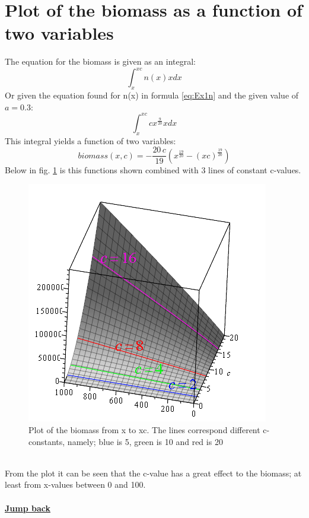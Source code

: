 \documentclass{article}
\numberwithin{equation}{section} %
\begin{document}
\section{Plot of the biomass as a function of two variables}\label{a:biomassPlot}
The equation for the biomass is given as an integral:
\begin{equation}
    \int_{x}^{xc}n(x)xdx
\end{equation}
Or given the equation found for n(x) in formula \ref{eq:Ex1n} and the given value of $a=0.3$:
\begin{equation}
    \int_{x}^{xc}cx^{\tfrac{9}{20}}xdx
\end{equation}
This integral yields a function of two variables:
\begin{equation}\label{eq:biomass2v}
biomass(x,c) = -{\frac {20\,c}{19} \left( {x}^{{\frac{19}{20}}}- \left( xc \right) ^{{\frac{19}{20}}} \right) }
\end{equation}
Below in fig. \ref{fig:a2p1} is this functions shown combined with 3 lines of constant c-values.
\begin{figure}[H]
\centering
    \includegraphics[width=.75\textwidth]{appendices/a2p1.png}
    \caption{Plot of the biomass from x to xc. The lines correspond different c-constants, namely; blue is 5, green is 10 and red is 20}
    \label{fig:a2p1}
\end{figure}\\
From the plot it can be seen that the c-value has a great effect to the biomass; at least from x-values between 0 and 100.\\
\\
\textbf{\hyperref[jmp:a:biomassPlot]{Jump back }}
\end{document}

